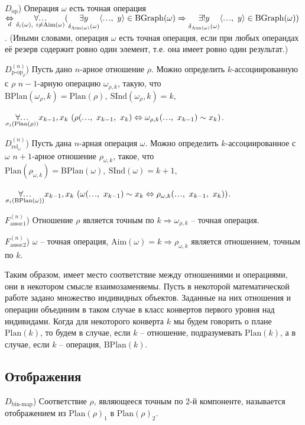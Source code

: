 \documentclass[a4paper]{article}
\newcommand\mydots{\hbox to 1em{.\hss.\hss.}}
\newcommand{\Def}[0]{\underset{d}{\Leftrightarrow}}
\newcommand{\Plan}[1]{\mathrm{Plan}(#1)}
\newcommand{\BPlan}[1]{\mathrm{BPlan}(#1)}
\newcommand{\BGraph}[1]{\mathrm{BGraph}(#1)}
\newcommand{\SInd}[1]{\mathrm{SInd}(#1)}
\newcommand{\Aim}[1]{\mathrm{Aim}(#1)}
\begin{document}
$D_\text{op}$) Операция $\omega$ есть точная операция $\Def \underset{\delta_i(\omega),~ i \ne \Aim{\omega}}{\forall \mydots} (\underset{\delta_{\Aim{\omega}}(\omega)}{\exists y} \langle \mydots,~ y \rangle \in \BGraph{\omega} \Rightarrow \underset{\delta_{\Aim{\omega}}(\omega)}{\exists! y} \langle \mydots,~ y \rangle \in \BGraph{\omega})$. (Иными словами, операция $\omega$ есть точная операция, если при любых операндах её резерв содержит ровно один элемент, т.е. она имеет ровно один результат.)

$D_{\text{p-op}_\rho}^{(n)}$) Пусть дано $n$-арное отношение $\rho$. Можно определить $k$-ассоциированную с $\rho$ $n-1$-арную операцию $\omega_{\rho, k}$, такую, что $\BPlan{\omega_\rho, k} = \Plan{\rho},~ \SInd{\omega_\rho, k} = k,$

$\underset{\sigma_i(\Plan{\rho})}{\forall \mydots} x_{k-1}, x_k~ (\rho(\mydots,~ x_{k-1},~ x_k) \Leftrightarrow \omega_{\rho, k} (\mydots,~ x_{k-1}) \sim x_k)$.

$D_{\text{rel}_\omega}^{(n)}$) Пусть дана $n$-арная операция $\omega$. Можно определить $k$-ассоциированное с $\omega$ $n+1$-арное отношение $\rho_{\omega, k}$, такое, что $\Plan{\rho_{\omega, k}} = \BPlan{\omega},~ \SInd{\omega} = k+1,$

$\underset{\sigma_i(\BPlan{\omega})}{\forall \mydots} x_{k-1}, x_k~ (\omega (\mydots,~ x_{k-1}) \sim x_k \Leftrightarrow \rho_{\omega, k}(\mydots,~ x_{k-1},~ x_k))$.

$F_\text{assoc1}^{(n)}$) Отношение $\rho$ является точным по $k \Rightarrow \omega_{\rho, k}$ -- точная операция.

$F_\text{assoc2}^{(n)}$) $\omega$ -- точная операция, $\Aim{\omega} = k \Rightarrow \rho_{\omega, k}$ является отношением, точным по $k$.

Таким образом, имеет место соответствие между отношениями и операциями, они в некотором смысле взаимозаменяемы. Пусть в некоторой математической работе задано множество индивидных объектов. Заданные на них отношения и операции объединим в таком случае в класс конвертов первого уровня над индивидами. Когда для некоторого конверта $k$ мы будем говорить о плане $\Plan{k}$, то будем в случае, если $k$ -- отношение, подразумевать $\Plan{k}$, а в случае, если $k$ -- операция, $\BPlan{k}$.

\subsection{Отображения}

$D_\text{bin-map}$) Соответствие $\rho$, являющееся точным по 2-й компоненте, называется отображением из $\Plan{\rho}_1$ в $\Plan{\rho}_2$.
\end{document}
